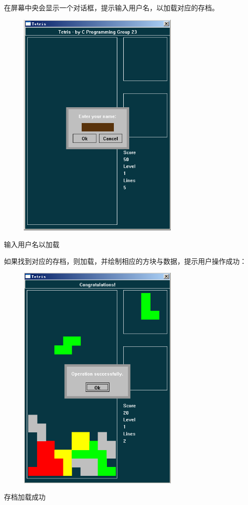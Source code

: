 \documentclass{style/ucasproposal}
\begin{document}
在屏幕中央会显示一个对话框，提示输入用户名，以加载对应的存档。
\begin{center}
\begin{figure}[H]
\center
    \includegraphics[width=0.7\textwidth]{./img/manual/10-load.png}
\end{figure}
输入用户名以加载
\end{center}

如果找到对应的存档，则加载，并绘制相应的方块与数据，提示用户操作成功：
\begin{center}
\begin{figure}[H]
\center
    \includegraphics[width=0.7\textwidth]{./img/manual/5-save-or-load-success.png}
\end{figure}
存档加载成功
\end{center}
\end{document}
